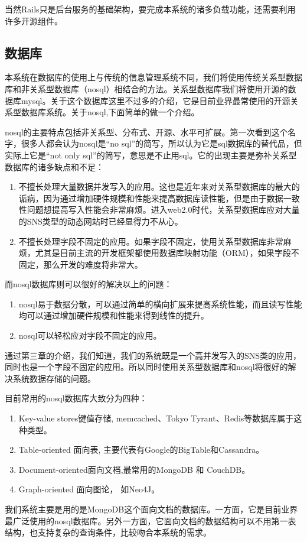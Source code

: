 当然Rails只是后台服务的基础架构，要完成本系统的诸多负载功能，还需要利用许多开源组件。

\subsection{数据库}
\label{sec:database}

本系统在数据库的使用上与传统的信息管理系统不同，我们将使用传统关系型数据库和非关系型数据库（nosql）相结合的方法。关系型数据库我们将使用开源的数据库mysql。关于这个数据库这里不过多的介绍，它是目前业界最常使用的开源关系型数据库系统。关于nosql,下面简单的做一个介绍。

nosql的主要特点包括非关系型、分布式、开源、水平可扩展。第一次看到这个名字，很多人都会认为nosql是“no sql”的简写，所以认为它是sql数据库的替代品，但实际上它是“not only sql”的简写，意思是不止用sql。它的出现主要是弥补关系型数据库的诸多缺点和不足：
\begin{enumerate}
\item 不擅长处理大量数据并发写入的应用。这也是近年来对关系型数据库的最大的诟病，因为通过增加硬件规模和性能来提高数据库读性能，但是由于数据一致性问题想提高写入性能会非常麻烦。进入web2.0时代，关系型数据库应对大量的SNS类型的动态网站时已经显得力不从心。
\item 不擅长处理字段不固定的应用。如果字段不固定，使用关系型数据库非常麻烦，尤其是目前主流的开发框架都使用数据库映射功能（ORM），如果字段不固定，那么开发的难度将非常大。
\end{enumerate}
而nosql数据库则可以很好的解决以上的问题：
\begin{enumerate}
\item nosql易于数据分散，可以通过简单的横向扩展来提高系统性能，而且读写性能均可以通过增加硬件规模和性能来得到线性的提升。
\item nosql可以轻松应对字段不固定的应用。
\end{enumerate}
通过第三章的介绍，我们知道，我们的系统既是一个高并发写入的SNS类的应用，同时也是一个字段不固定的应用。所以同时使用关系型数据库和nosql将很好的解决系统数据存储的问题。


目前常用的nosql数据库大致分为四种：
\begin{enumerate}
\item Key-value stores键值存储, memcached、Tokyo Tyrant、Redis等数据库属于这种类型。
\item Table-oriented 面向表, 主要代表有Google的BigTable和Cassandra。
\item Document-oriented面向文档,最常用的MongoDB 和 CouchDB。
\item Graph-oriented 面向图论， 如Neo4J。
\end{enumerate}
我们系统主要是用的是MongoDB这个面向文档的数据库。一方面，它是目前业界最广泛使用的nosql数据库。另外一方面，它面向文档的数据结构可以不用第一表结构，也支持复杂的查询条件，比较吻合本系统的需求。

